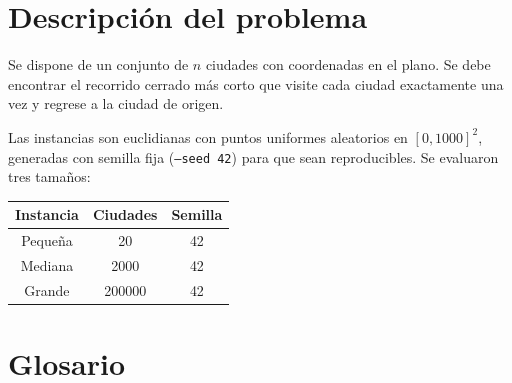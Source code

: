 \documentclass[12pt,a4paper]{article}
\begin{document}
\section{Descripción del problema}

Se dispone de un conjunto de $n$ ciudades con coordenadas en el plano. Se debe
encontrar el recorrido cerrado más corto que visite cada ciudad exactamente una
vez y regrese a la ciudad de origen.

Las instancias son euclidianas con puntos uniformes aleatorios en
$[0,1000]^2$, generadas con semilla fija (\texttt{--seed 42}) para que sean
reproducibles. Se evaluaron tres tamaños:

\begin{center}
\begin{tabular}{ccc}
\toprule
Instancia & Ciudades & Semilla \\
\midrule
Pequeña & 20 & 42 \\
Mediana & 2000 & 42 \\
Grande & 200000 & 42 \\
\bottomrule
\end{tabular}
\end{center}

\section{Glosario}
\end{document}
